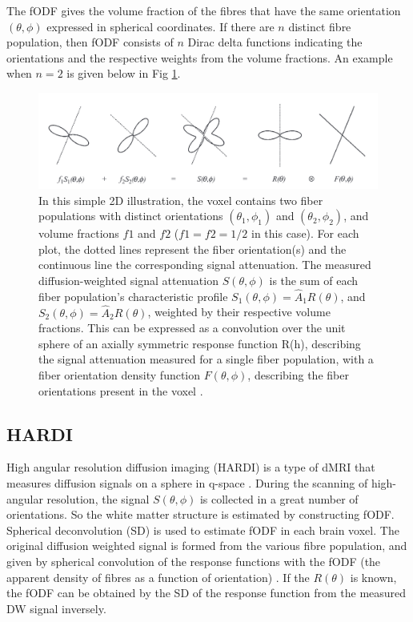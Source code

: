 The fODF gives the volume fraction of the fibres that have the same orientation $(\theta, \phi)$ expressed in spherical coordinates. 
If there are $n$ distinct fibre population, then fODF consists of $n$ Dirac delta functions indicating the orientations and the respective weights
from the volume fractions. An example when $n = 2$ is given below in Fig \ref{fig:2dconv}. 

\begin{figure}[ht]
    \centering
    \includegraphics[width= 15cm]{figures/2D.png}
        \caption{In this simple 2D illustration, the voxel contains two fiber populations with distinct orientations
         $(\theta_{1} ,\phi_{1})$ and $(\theta_{2} ,\phi_{2})$, and volume fractions $f1$ and $f2$ ($f1 = f2 = 1/2$ in this case). 
         For each plot, the dotted lines represent the fiber orientation(s) and the continuous line the corresponding signal attenuation. 
         The measured diffusion-weighted signal attenuation $S(\theta, \phi)$ is the sum of each fiber population’s characteristic profile $S_{1}(\theta, \phi) = \hat{A}_{1}R(\theta)$, and $S_{2}(\theta, \phi) = \hat{A}_{2}R(\theta)$, 
         weighted by their respective volume fractions. This can be expressed as a convolution over the unit sphere of an axially symmetric response function R(h), 
         describing the signal attenuation measured for a single fiber population, with a fiber orientation density function $F(\theta ,\phi)$, 
         describing the fiber orientations present in the voxel \cite{tournierDirectEstimationFiber2004}. }
    \label{fig:2dconv}
\end{figure}

\subsection{HARDI}
High angular resolution diffusion imaging (HARDI) is a type of dMRI that measures diffusion signals on a sphere in q-space \cite{consagraOptimizedDiffusionImaging2022}.
During the scanning of high-angular resolution, the signal $S(\theta, \phi)$ is collected in a great number of orientations.
So the white matter structure is estimated by constructing fODF. Spherical deconvolution (SD) is used to estimate fODF in each brain voxel. 
The original diffusion weighted signal is formed from the
various fibre population, and given by spherical convolution of the response functions with the fODF (the apparent density of fibres as a function of orientation) \cite{jeurissenMultitissueConstrainedSpherical2014}. 
If the $R(\theta)$ is known, the fODF can be obtained by the SD of the response function from the measured DW signal inversely.
